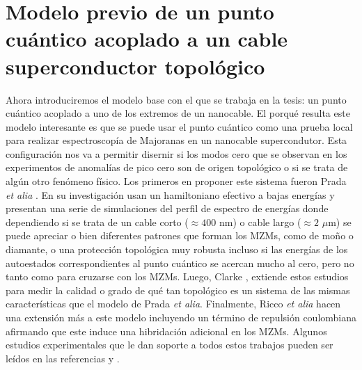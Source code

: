 \section{Modelo previo de un punto cu\'{a}ntico acoplado a un cable superconductor topol\'{o}gico}
Ahora introduciremos el modelo base con el que se trabaja en la tesis: un punto cu\'{a}ntico acoplado a uno de los extremos de un nanocable. El porqu\'{e} resulta este modelo interesante es que se puede usar el punto cu\'{a}ntico como una prueba local para realizar espectroscop\'{i}a de Majoranas en un nanocable supercondutor. Esta configuraci\'{o}n nos va a permitir disernir si los modos cero que se observan en los experimentos de anomal\'{i}as de pico cero son de origen topol\'{o}gico o si se trata de alg\'{u}n otro fen\'{o}meno f\'{i}sico. Los primeros en proponer este sistema fueron Prada \emph{et alia} \cite{PhysRevB.96.085418}. En su investigaci\'{o}n usan un hamiltoniano efectivo a bajas energ\'{i}as y presentan una serie de simulaciones del perfil de espectro de energ\'{i}as donde dependiendo si se trata de un cable corto ($\approx 400$ nm) o cable largo ($\approx 2$ $\mu$m) se puede apreciar o bien diferentes patrones que forman los MZMs, como de  mo\~{n}o o diamante, o una protecci\'{o}n topol\'{o}gica muy robusta incluso si las energ\'{i}as de los autoestados correspondientes al punto cu\'{a}ntico se acercan mucho al cero, pero no tanto como para cruzarse con los MZMs. Luego, Clarke \cite{PhysRevB.96.201109}, extiende estos estudios para medir la calidad o grado de qu\'{e} tan topol\'{o}gico es un sistema de las mismas caracter\'{i}sticas que el modelo de Prada \emph{et alia}. Finalmente, Ricco \emph{et alia} \cite{PhysRevB.102.165104} hacen una extensi\'{o}n m\'{a}s a este modelo incluyendo un t\'{e}rmino de repulsi\'{o}n coulombiana afirmando que este induce una hibridaci\'{o}n adicional en los MZMs. Algunos estudios experimentales que le dan soporte a todos estos trabajos pueden ser le\'{i}dos en las referencias \cite{PhysRevB.98.085125} y \cite{DEEENG}. 
%
%
